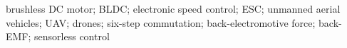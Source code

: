 \documentclass[diplomskirad]{fer}
\begin{document}
\begin{keywords}
	brushless DC motor; BLDC; electronic speed control; ESC; unmanned aerial vehicles; UAV; drones; six-step commutation; back-electromotive force; back-EMF; sensorless control
\end{keywords}


\backmatter

\end{document}
